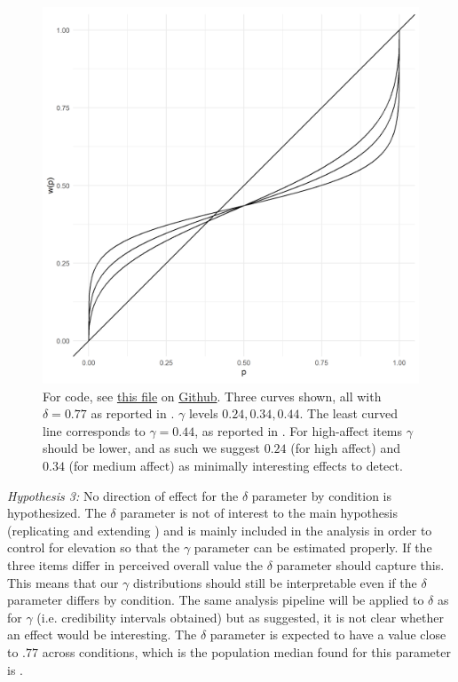 \documentclass[12pt]{article}
\begin{document}
\begin{figure}[H]
	\includegraphics[width = \linewidth]{../Figures/ourHyp.png}
	\caption{For code, see
		\href{https://github.com/victor-m-p/BayesianDecisionWeights/blob/main/Code/0_visualize_parameters.Rmd}
		{this file} on
		\href{https://github.com/victor-m-p/BayesianDecisionWeights}{Github}.
		Three curves shown, all with $\delta = 0.77$
	as reported in \textcite{gonzalez1999shape}.
	$\gamma$ levels $0.24, 0.34, 0.44$. The
	least curved line corresponds to $\gamma = 0.44$,
	as reported in \textcite{gonzalez1999shape}.
	For high-affect items $\gamma$ should
	be lower, and as such we suggest $0.24$
	(for high affect) and  $0.34$ (for medium
	affect) as minimally interesting effects
to detect.}
\end{figure}

\emph{Hypothesis 3:} No direction of effect
for the $\delta$ parameter by condition is
hypothesized. The  $\delta$ parameter is
not of interest to the main hypothesis
(replicating and extending \textcite{rottenstreich2001money})
and is mainly included in the analysis in
order to control for elevation so that the
$\gamma$ parameter can be estimated
properly. If the three items differ
in perceived overall value the $\delta$ parameter
should capture this. This means that our $\gamma$
distributions should still be interpretable
even if the $\delta$ parameter differs by
condition. The same analysis pipeline will be applied
to $\delta$ as for $\gamma$ (i.e. credibility
intervals obtained) but as suggested,
it is not clear whether an effect would
be interesting. The $\delta$ parameter is
expected to have a value close to $.77$
across conditions,
which is the population median found for
this parameter is \textcite{gonzalez1999shape}.
\end{document}
